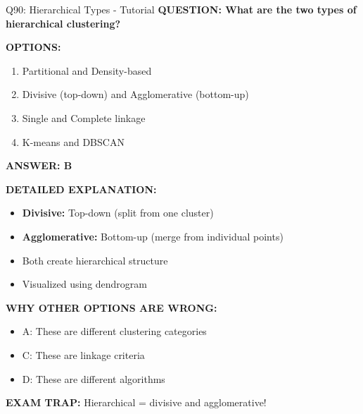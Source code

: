 \documentclass[8pt]{beamer}
\begin{document}
	\begin{frame}{Q90: Hierarchical Types - Tutorial}
		\fontsize{6.5}{7.5}\selectfont
		\textbf{QUESTION: What are the two types of hierarchical clustering?}
		
		\vspace{0.1cm}
		\textbf{OPTIONS:}
		\begin{enumerate}
			\item Partitional and Density-based
			\item Divisive (top-down) and Agglomerative (bottom-up)
			\item Single and Complete linkage
			\item K-means and DBSCAN
		\end{enumerate}
		
		\vspace{0.1cm}
		\textcolor{myblue}{\textbf{ANSWER: B}}
		
		\vspace{0.1cm}
		\textbf{DETAILED EXPLANATION:}
		\begin{itemize}
			\item \textbf{Divisive:} Top-down (split from one cluster)
			\item \textbf{Agglomerative:} Bottom-up (merge from individual points)
			\item Both create hierarchical structure
			\item Visualized using dendrogram
		\end{itemize}
		
		\vspace{0.1cm}
		\textcolor{myred}{\textbf{WHY OTHER OPTIONS ARE WRONG:}}
		\begin{itemize}
			\item \textcolor{myred}{A:} These are different clustering categories
			\item \textcolor{myred}{C:} These are linkage criteria
			\item \textcolor{myred}{D:} These are different algorithms
		\end{itemize}
		
		\textcolor{myred}{\textbf{EXAM TRAP:}} Hierarchical = \textcolor{myblue}{divisive and agglomerative}!
	\end{frame}
	
\end{document}
